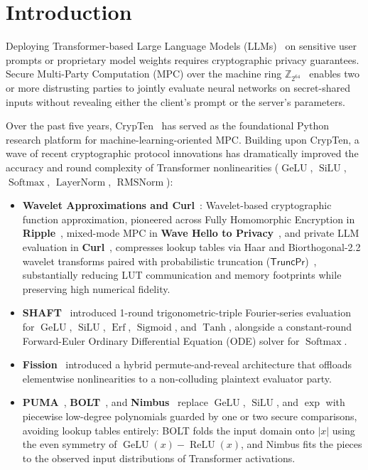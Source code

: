 \documentclass[11pt]{article}
\newcommand{\Zring}{\mathbb{Z}_{2^{64}}}
\begin{document}
\section{Introduction}
\label{sec:intro}

Deploying Transformer-based Large Language Models (LLMs)~\cite{vaswani2017attention} on sensitive user prompts or proprietary model weights requires cryptographic privacy guarantees. Secure Multi-Party Computation (MPC) over the machine ring $\Zring$~\cite{mohassel2017secureml,rathee2020cryptflow2,knott2021crypten,hao2022iron} enables two or more distrusting parties to jointly evaluate neural networks on secret-shared inputs without revealing either the client's prompt or the server's parameters.

Over the past five years, CrypTen~\cite{knott2021crypten} has served as the foundational Python research platform for machine-learning-oriented MPC. Building upon CrypTen, a wave of recent cryptographic protocol innovations has dramatically improved the accuracy and round complexity of Transformer nonlinearities ($\operatorname{GeLU}$, $\operatorname{SiLU}$, $\operatorname{Softmax}$, $\operatorname{LayerNorm}$, $\operatorname{RMSNorm}$):
\begin{itemize}
    \item \textbf{Wavelet Approximations and Curl}~\cite{gouert2024ripple,reis2025wave,santos2024curl}: Wavelet-based cryptographic function approximation, pioneered across Fully Homomorphic Encryption in \textbf{Ripple}~\cite{gouert2024ripple}, mixed-mode MPC in \textbf{Wave Hello to Privacy}~\cite{reis2025wave}, and private LLM evaluation in \textbf{Curl}~\cite{santos2024curl}, compresses lookup tables via Haar and Biorthogonal-2.2 wavelet transforms paired with probabilistic truncation ($\mathsf{TruncPr}$)~\cite{escudero2020improved}, substantially reducing LUT communication and memory footprints while preserving high numerical fidelity.
    \item \textbf{SHAFT}~\cite{kei2025shaft} introduced 1-round trigonometric-triple Fourier-series evaluation for $\operatorname{GeLU}$, $\operatorname{SiLU}$, $\operatorname{Erf}$, $\operatorname{Sigmoid}$, and $\operatorname{Tanh}$, alongside a constant-round Forward-Euler Ordinary Differential Equation (ODE) solver for $\operatorname{Softmax}$.
    \item \textbf{Fission}~\cite{ugurbil2025fission} introduced a hybrid permute-and-reveal architecture that offloads elementwise nonlinearities to a non-colluding plaintext evaluator party.
    \item \textbf{PUMA}~\cite{dong2023puma}, \textbf{BOLT}~\cite{pang2024bolt}, and \textbf{Nimbus}~\cite{li2024nimbus} replace $\operatorname{GeLU}$, $\operatorname{SiLU}$, and $\exp$ with piecewise low-degree polynomials guarded by one or two secure comparisons, avoiding lookup tables entirely: BOLT folds the input domain onto $|x|$ using the even symmetry of $\operatorname{GeLU}(x) - \operatorname{ReLU}(x)$, and Nimbus fits the pieces to the observed input distributions of Transformer activations.
\end{itemize}
\end{document}
